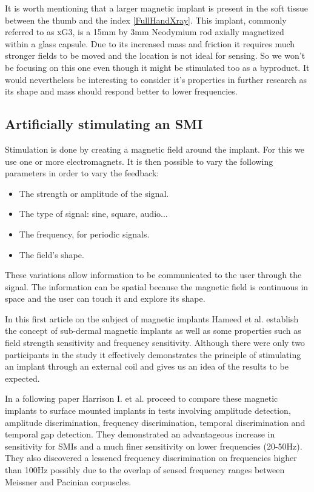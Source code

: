 \documentclass[10pt,journal,compsoc]{IEEEtran}
\begin{document}
		It is worth mentioning that a larger magnetic implant is present in the soft tissue between the thumb and the index \ref{FullHandXray}. This implant, commonly referred to as xG3, is a 15mm by 3mm Neodymium rod axially magnetized within a glass capsule. Due to its increased mass and friction it requires much stronger fields to be moved and the location is not ideal for sensing. So we won't be focusing on this one even though it might be stimulated too as a byproduct. It would nevertheless be interesting to consider it's properties in further research as its shape and mass should respond better to lower frequencies.
			
	\subsection{Artificially stimulating an SMI}
	Stimulation is done by creating a magnetic field around the implant. For this we use one or more electromagnets. It is then possible to vary the following parameters in order to vary the feedback:
	
	\begin{itemize}
		\item The strength or amplitude of the signal.
		\item The type of signal: sine, square, audio...
		\item The frequency, for periodic signals.
		\item The field's shape.
	\end{itemize}
	
	These variations allow information to be communicated to the user through the signal. The information can be spatial because the magnetic field is continuous in space and the user can touch it and explore its shape.
	
	
	In this first article on the subject of magnetic implants \cite{hameed2010ieee} Hameed et al. establish the concept of sub-dermal magnetic implants as well as some properties such as field strength sensitivity and frequency sensitivity. Although there were only two participants in the study it effectively demonstrates the principle of stimulating an implant through an external coil and gives us an idea of the results to be expected.
	
	In a following paper \cite{harrison2018tf} Harrison I. et al. proceed to compare these magnetic implants to surface mounted implants in tests involving amplitude detection, amplitude discrimination, frequency discrimination, temporal discrimination and temporal gap detection. They demonstrated an advantageous increase in sensitivity for SMIs and a much finer sensitivity on lower frequencies (20-50Hz). They also discovered a lessened frequency discrimination on frequencies higher than 100Hz possibly due to the overlap of sensed frequency ranges between Meissner and Pacinian corpuscles.
	
\end{document}
